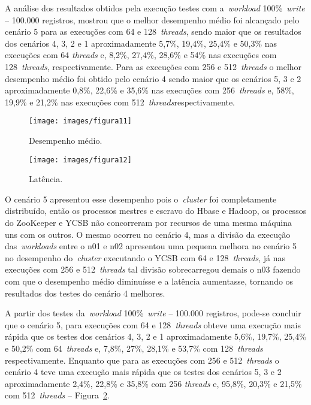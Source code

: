 \documentclass[12pt]{article}
\begin{document}
A análise dos resultados obtidos pela execução testes com a~\emph{workload} 100\%~\emph{write} -- 100.000 registros, mostrou que o melhor desempenho médio foi alcançado pelo cenário 5 para as execuções com 64 e 128~\emph{threads}, sendo maior que os resultados dos cenários 4, 3, 2 e 1 aproximadamente 5,7\%, 19,4\%, 25,4\% e 50,3\% nas execuções com 64 \emph{threads} e, 8,2\%, 27,4\%, 28,6\% e 54\% nas execuções com 128~\emph{threads}, respectivamente. Para as execuções com 256 e 512~\emph{threads} o melhor desempenho médio foi obtido pelo cenário 4 sendo maior que os cenários 5, 3 e 2 aproximadamente 0,8\%, 22,6\% e 35,6\% nas execuções com 256~\emph{threads} e, 58\%, 19,9\% e 21,2\% nas execuções com 512~\emph{threads}respectivamente.

\begin{figure*}
    \centering
    \begin{subfigure}[b]{0.49\textwidth}
        \centering
        \texttt{[image: images/figura11]}
        \caption{Desempenho médio.}
        \label{figura11}
    \end{subfigure}
        \hfill
    \begin{subfigure}[b]{0.49\textwidth}  
        \centering 
        \texttt{[image: images/figura12]}
        \caption{Latência.}%
        \label{figura12}
    \end{subfigure}
    \caption{\emph{Workload} 100\%~\emph{write} -- 100.000 registros nos cenários de 1 a 5.}
\end{figure*}

O cenário 5 apresentou esse desempenho pois o~\emph{cluster} foi completamente distribuído, então os processos mestres e escravo do Hbase e Hadoop, os processos do ZooKeeper e YCSB não concorreram por recursos de uma mesma máquina uns com os outros. O mesmo ocorreu no cenário 4, mas a divisão da execução das~\emph{workloads} entre o n01 e n02 apresentou uma pequena melhora no cenário 5 no desempenho do~\emph{cluster}  executando o YCSB com 64 e 128~\emph{threads}, já nas execuções com 256 e 512~\emph{threads} tal divisão sobrecarregou demais o n03 fazendo com que o desempenho médio diminuísse e a latência aumentasse, tornando os resultados dos testes do cenário 4 melhores.

A partir dos testes da~\emph{workload} 100\%~\emph{write} -- 100.000 registros, pode-se concluir que o cenário 5, para execuções com 64 e 128~\emph{threads} obteve uma execução mais rápida que os testes dos cenários 4, 3, 2 e 1 aproximadamente 5,6\%, 19,7\%, 25,4\% e 50,2\% com 64~\emph{threads} e, 7,8\%, 27\%, 28,1\% e 53,7\% com 128~\emph{threads} respectivamente. Enquanto que para as execuções com 256 e 512~\emph{threads} o cenário 4 teve uma execução mais rápida que os testes dos cenários 5, 3 e 2 aproximadamente 2,4\%, 22,8\% e 35,8\% com 256 \emph{threads} e, 95,8\%, 20,3\% e 21,5\% com 512~\emph{threads} -- Figura~\ref{figura12}.
\end{document}
